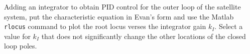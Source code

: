 
Adding an integrator to obtain PID control for the outer loop of the satellite system, put the characteristic equation in Evan's form and use the Matlab {\tt rlocus} command to plot the root locus verses the integrator gain $k_I$.  Select a value for $k_I$ that does not significantly change the other locations of the closed loop poles.  